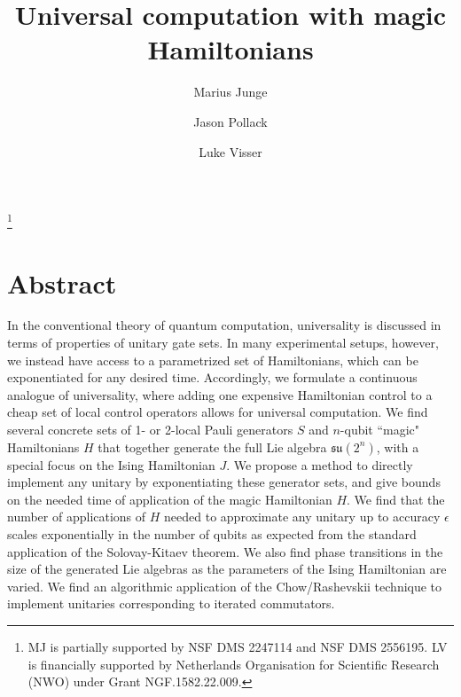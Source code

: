 \documentclass[12pt, a4-paper]{amsart}
\newcommand{\mf}[1]{\mathfrak{#1}}
\numberwithin{equation}{section}
\begin{document}
\title{Universal computation with magic Hamiltonians}

\author{Marius Junge}
\address{Department of Mathematics, University of Illinois at Urbana-Champaign, Urbana, IL 61801, USA}
\author{Jason Pollack}
\address{Department of Electrical Engineering \& Computer Science and Institute for Quantum \& Information Sciences, Syracuse University, New York, USA}
\author{Luke Visser}
\address{Department of Applied Mathematics, Eindhoven University of Technology, Eindhoven, The Netherlands}

\thanks{MJ is partially supported by NSF DMS 2247114 and NSF DMS 2556195. LV is financially supported by Netherlands Organisation for Scientific Research (NWO) under Grant NGF.1582.22.009.}

\maketitle

\section*{Abstract} \label{ch:abstract}
In the conventional theory of quantum computation, universality is discussed in terms of properties of unitary gate sets. In many experimental setups, however, we instead have access to a parametrized set of Hamiltonians, which can be exponentiated for any desired time. Accordingly, we formulate a continuous analogue of universality, where adding one expensive Hamiltonian control to a cheap set of local control operators allows for universal computation. We find several concrete sets of 1- or 2-local Pauli generators $S$ and $n$-qubit ``magic" Hamiltonians $H$ that together generate the full Lie algebra $\mf{su}(2^n)$, with a special focus on the Ising Hamiltonian $J$. We propose a method to directly implement any unitary by exponentiating these generator sets, and give bounds on the needed time of application of the magic Hamiltonian $H$. We find that the number of applications of $H$ needed to approximate any unitary up to accuracy $\epsilon$ scales exponentially in the number of qubits as expected from the standard application of the Solovay-Kitaev theorem. 
We also find phase transitions in the size of the generated Lie algebras as the parameters of the Ising Hamiltonian are varied. We find an algorithmic application of the Chow/Rashevskii technique to implement unitaries corresponding to iterated commutators.
\end{document}
